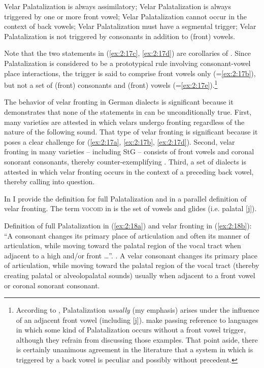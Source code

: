 \begin{xlist}
\begin{xlist}
\ea%
\label{ex:2:17}
\ea\label{ex:2:17a}Velar Palatalization is always assimilatory;
\ex\label{ex:2:17b}Velar Palatalization is always triggered by one or more front vowel;
\ex\label{ex:2:17c}Velar Palatalization cannot occur in the context of back vowels;
\ex\label{ex:2:17d}Velar Palatalization must have a segmental trigger;
\ex\label{ex:2:17e}Velar Palatalization is not triggered by consonants in addition to (front) vowels.
\z 
\z{}

Note that the two statements in (\ref{ex:2:17c}, \ref{ex:2:17d}) are corollaries of . Since Palatalization is considered to be a prototypical rule involving consonant-vowel place interactions, the trigger is said to comprise front vowels only (=\ref{ex:2:17b}), but not a set of (front) consonants and (front) vowels (=\ref{ex:2:17e}).\footnote{According to \citet{Kochetov2011}, Palatalization \textit{usually} (my emphasis) arises under the influence of an adjacent front vowel (including [j]). \citet[2]{KrämerUrek2016} make passing reference to languages in which some kind of Palatalization occurs without a front vowel trigger, although they refrain from discussing those examples. That point aside, there is certainly unanimous agreement in the literature that a system in which  is triggered by a back vowel is peculiar and possibly without precedent.}

The behavior of velar fronting in German dialects is significant because it demonstrates that none of the statements in  can be unconditionally true. First, many varieties are attested in which velars undergo fronting regardless of the nature of the following sound. That type of velar fronting is significant because it poses a clear challenge for (\ref{ex:2:17a}, \ref{ex:2:17b}, \ref{ex:2:17d}). Second, velar fronting in many varieties -- including StG -- consists of front vowels and coronal sonorant consonants, thereby counter-exemplifying . Third, a set of dialects is attested in which velar fronting occurs in the context of a preceding back vowel, thereby calling  into question.

In  I provide the definition for full Palatalization \citep{Bateman2011} and in  a parallel definition of velar fronting. The term \textsc{vocoid} in  is the set of vowels and glides (i.e. palatal [j]).

\eanoraggedright%
\label{ex:2:18}Definition of full Palatalization in (\ref{ex:2:18a}) and velar fronting in (\ref{ex:2:18b}):
\eanoraggedright “A consonant changes its primary place of articulation and often its manner of articulation, while moving toward the palatal region of the vocal tract when adjacent to a high and/or front …”. \citep[589]{Bateman2011}.\label{ex:2:18a}
\ex A velar consonant changes its primary place of articulation, while moving toward the palatal region of the vocal tract (thereby creating palatal or alveolopalatal sounds) usually when adjacent to a front vowel or coronal sonorant consonant.\label{ex:2:18b}
\z
\z 


\end{xlist}
\end{xlist}
